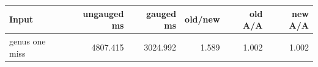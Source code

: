 \begin{center}
\small
\begin{tabular}{lrrrrr}
\toprule
Input & ungauged ms & gauged ms & old/new & old A/A & new A/A\\
\midrule
genus one miss & 4807.415 & 3024.992 & 1.589 & 1.002 & 1.002\\
\bottomrule
\end{tabular}
\end{center}
